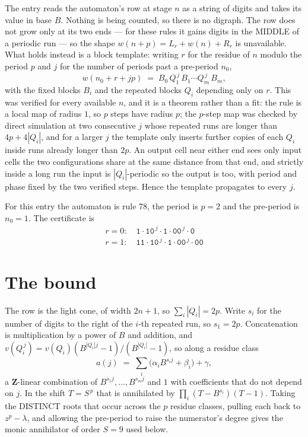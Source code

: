 \documentclass[11pt,a4paper]{article}
\theoremstyle{plain}
\theoremstyle{definition}
\begin{document}
The entry reads the automaton's row at stage $n$ as a string of digits and takes its value in
base $B$. Nothing is being counted, so there is no digraph. The row does not grow only at its
two ends --- for these rules it gains digits in the MIDDLE of a periodic run --- so the shape
$w(n+p)=L_r+w(n)+R_r$ is unavailable. What holds instead is a block template: writing $r$ for
the residue of $n$ modulo the period $p$ and $j$ for the number of periods past a pre-period
$n_0$,
\[
w(n_0 + r + jp)\;=\;B_0\,Q_1^{\,j}\,B_1\cdots Q_m^{\,j}\,B_m,
\]
with the fixed blocks $B_i$ and the repeated blocks $Q_i$ depending only on $r$. This was
verified for every available $n$, and it is a theorem rather than a fit: the rule is a local
map of radius $1$, so $p$ steps have radius $p$; the $p$-step map was checked by direct
simulation at two consecutive $j$ whose repeated runs are longer than $4p+4|Q_i|$, and for a
larger $j$ the template only inserts further copies of each $Q_i$ inside runs already longer
than $2p$. An output cell near either end sees only input cells the two configurations share
at the same distance from that end, and strictly inside a long run the input is
$|Q_i|$-periodic so the output is too, with period and phase fixed by the two verified steps.
Hence the template propagates to every $j$.

For this entry the automaton is rule 78, the period is $p=2$ and the pre-period is $n_0=1$.
The certificate is
\begin{gather*}
r=0:\quad \texttt{1} \cdot \texttt{10}^{\,j} \cdot \texttt{1} \cdot \texttt{00}^{\,j} \cdot \texttt{0} \\
r=1:\quad \texttt{11} \cdot \texttt{10}^{\,j} \cdot \texttt{1} \cdot \texttt{00}^{\,j} \cdot \texttt{00}
\end{gather*}

\section{The bound}

The row is the light cone, of width $2n+1$, so $\sum_i|Q_i|=2p$. Write $s_i$ for the number of
digits to the right of the $i$-th repeated run, so $s_1=2p$. Concatenation is multiplication by
a power of $B$ and addition, and $v(Q_i^{\,j})=v(Q_i)(B^{|Q_i|j}-1)/(B^{|Q_i|}-1)$, so along a
residue class
\[
a(j)\;=\;\sum_i \big(\alpha_i B^{s_i j} + \beta_i\big) + \gamma,
\]
a $\mathbf{Z}$-linear combination of $B^{s_1 j},\dots,B^{s_m j}$ and $1$ with coefficients that
do not depend on $j$. In the shift $T=S^{\,p}$ that is annihilated by
$\prod_i(T-B^{s_i})(T-1)$. Taking the DISTINCT roots that occur across the $p$ residue classes,
pulling each back to $z^p-\lambda$, and allowing the pre-period to raise the numerator's degree
gives the monic annihilator of order $S=9$ used below.
\end{document}
